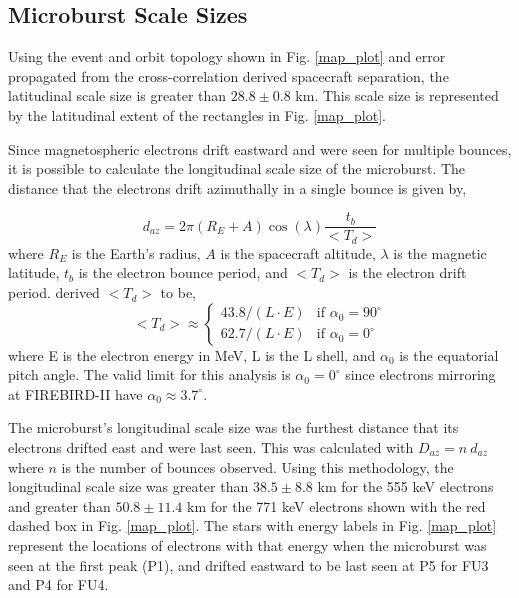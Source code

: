 \documentclass[draft,linenumbers]{agujournal}
\begin{document}
\subsection{Microburst Scale Sizes} \label{scale_size} %
Using the event and orbit topology shown in Fig. \ref{map_plot} and error propagated from the cross-correlation derived spacecraft separation, the latitudinal scale size is greater than $ 28.8 \pm 0.8$ km. This scale size is represented by the latitudinal extent of the rectangles in Fig. \ref{map_plot}.

Since magnetospheric electrons drift eastward and were seen for multiple bounces, it is possible to calculate the longitudinal scale size of the microburst. The distance that the electrons drift azimuthally in a single bounce is given by, 

\begin{equation}
d_{az} = 2 \pi (R_E + A) \cos(\lambda) \frac{t_b}{<T_{d}>}
\label{bounce_drift}
\end{equation} where $R_E$ is the Earth's radius, $A$ is the spacecraft altitude, $\lambda$ is the magnetic latitude, $t_b$ is the electron bounce period, and $<T_{d}>$ is the electron drift period. \citet{Parks2003} derived $<T_{d}>$ to be,
\begin{equation}
<T_{d}> \approx
\begin{cases}
43.8 /(L \cdot E) & \text{if } \alpha_0 = 90^{\circ} \\    62.7/(L \cdot E) & \text{if } \alpha_0 = 0^{\circ}
\end{cases}
\label{drift}
\end{equation} where E is the electron energy in MeV, L is the L shell, and $\alpha_0$ is the equatorial pitch angle. The valid limit for this analysis is $\alpha_0 = 0^{\circ}$ since electrons mirroring at FIREBIRD-II have $\alpha_0 \approx 3.7^{\circ}$. 

The microburst's longitudinal scale size was the furthest distance that its electrons drifted east and were last seen. This was calculated with $D_{az} = n \ d_{az}$ where $n$ is the number of bounces observed. Using this methodology, the longitudinal scale size was greater than $ 38.5 \pm 8.8$ km for the 555 keV electrons and greater than $ 50.8 \pm 11.4$ km for the 771 keV electrons shown with the red  dashed box in Fig. \ref{map_plot}. The stars with energy labels in Fig. \ref{map_plot} represent the locations of electrons with that energy when the microburst was seen at the first peak (P1), and drifted eastward to be last seen at P5 for FU3 and P4 for FU4.
\end{document}
